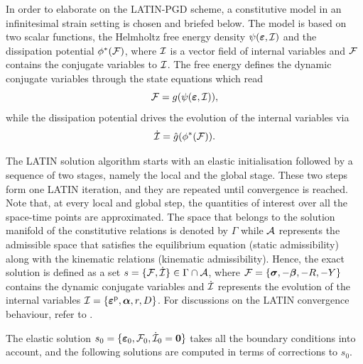 In order to elaborate on the LATIN-PGD scheme, a constitutive model in an infinitesimal strain setting is chosen and briefed below. The model is based on two scalar functions, the Helmholtz free energy density $\psi(\mbox{$\bm \varepsilon $},{\cal I})$ and the dissipation potential $\phi^\ast({\cal F})$, where ${\cal I}$ is a vector field of internal variables and ${\cal F}$ contains the conjugate variables to ${\cal I}$. The free energy defines the dynamic conjugate variables through the state equations which read
\begin{equation}
	{\cal F} = g(\psi(\mbox{$\bm \varepsilon $},{\cal I})),
	\label{eq:state_law_damage}
\end{equation}
while the dissipation potential drives the evolution of the internal variables via
\begin{equation}
	\dot{{\cal I}} = \hat{g}{(\phi^\ast({\cal F}))}.
	\label{eq:evolution_damage}
\end{equation}

The LATIN solution algorithm starts with an elastic initialisation followed by a sequence of two stages, namely the local and the global stage. These two steps form one LATIN iteration, and they are repeated until convergence is reached. Note that, at every local and global step, the quantities of interest over all the space-time points are approximated. The space that belongs to the solution manifold of the constitutive relations is denoted by $\Gamma$ while ${\cal A}$ represents the admissible space that satisfies the equilibrium equation (static admissibility) along with the kinematic relations (kinematic admissibility). Hence, the exact solution is defined as a set $s = \{{\cal F},\dot{{\cal I}}\} \in \Gamma \cap {\cal A}$, where ${\cal F}=\{\mbox{$\bm \sigma$},-\mbox{$\bm \beta$},-R,-Y\}$ contains the dynamic conjugate variables and $\dot{{\cal I}}$ represents the evolution of the internal variables ${\cal I}=\{\mbox{$\bm \varepsilon $}^{\rm{p}},\mbox{$\bm \alpha$},r,D\}$. For discussions on the LATIN convergence behaviour, refer to \parencite{lad1999,chinesta2014separated,Ladeveze2000bduality}.

The elastic solution $s_0=\{\mbox{$\bm \varepsilon $}_0,{\cal F}_0,\dot{{\cal I}}_0=\mbox{$\bm  0$}\}$ takes all the boundary conditions into account, and the following solutions are computed in terms of corrections to $s_0$.

